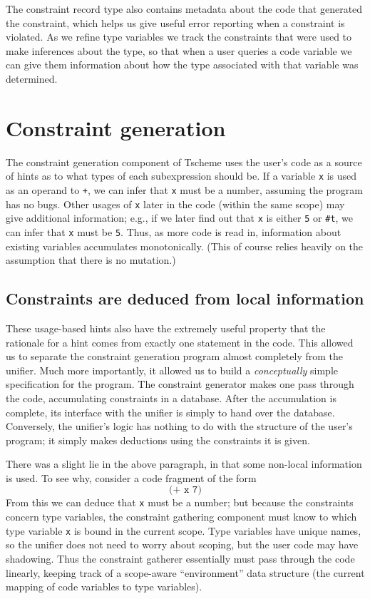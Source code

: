 \documentclass[a4paper]{article}
\begin{document}
The constraint record type also contains
metadata about the code that generated the constraint, which helps us give 
useful error reporting when a constraint is violated.  As we refine type 
variables we track the constraints that were used to make inferences about the 
type, so that when a user queries a code variable we can give them information 
about how the type associated with that variable was determined.

\section{Constraint generation}

\newcommand{\T}[1]{\texttt{#1}}

The constraint generation component of Tscheme uses the user's code as a source
of hints as to what types of each subexpression should be.  If a variable \T{x}
is used as an operand to \T{+}, we can infer that \T{x} must be a number,
assuming the program has no bugs.  Other usages of \T{x} later in the code
(within the same scope) may give additional information; e.g., if we later find
out that \T{x} is either \T5 or \T{\#t}, we can infer that \T{x} must be \T{5}.
Thus, as more code is read in, information about existing variables accumulates
monotonically.  (This of course relies heavily on the assumption that there is
no mutation.)

\subsection{Constraints are deduced from local information}
These usage-based hints also have the extremely useful property that the
rationale for a hint comes from exactly one statement in the code.  This allowed
us to separate the constraint generation program almost completely from the
unifier.  Much more importantly, it allowed us to build a {\em conceptually}
simple specification for the program.  The constraint generator makes one pass
through the code, accumulating constraints in a database.  After the
accumulation is complete, its interface with the unifier is simply to hand over
the database.  Conversely, the unifier's logic has nothing to do with the
structure of the user's program; it simply makes deductions using the
constraints it is given.

There was a slight lie in the above paragraph, in that some non-local
information is used.  To see why, consider a code fragment of the form
\[ \T{(+ x 7)} \]
From this we can deduce that \T{x} must be a number; but because the constraints
concern type variables, the constraint gathering component must know to which
type variable \T{x} is bound in the current scope.  Type variables have unique
names, so the unifier does not need to worry about scoping, but the user code
may have shadowing.  Thus the constraint gatherer essentially must pass through
the code linearly, keeping track of a scope-aware ``environment'' data structure
(the current mapping of code variables to type variables).
\end{document}

